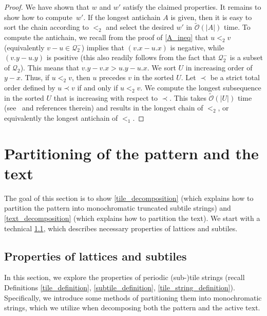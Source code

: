 \documentclass[11pt, letterpaper]{article}
\theoremstyle{plain}
\theoremstyle{definition}
\theoremstyle{remark}
\newcommand{\tO}{\tilde{\mathcal{O}}}
\newcommand{\Q}{\mathcal{Q}}
\newcommand{\absolute}[1]{\left\lvert#1\right\rvert}
\begin{document}
\begin{proof}
We have shown that $w$ and $w'$ satisfy the claimed properties. 
It remains to show how to compute~$w'$. 
If the longest antichain $A$ is given, then it is easy to sort the chain according to $<_2$ and select the desired $w'$ in $\tO(\absolute{A})$ time. To compute the antichain, we recall from the proof of \cref{A_ineq} that $u <_2 v$ (equivalently $v - u \in \Q_2^-$) implies that $(v.x - u.x)$ is negative, while $(v.y - u.y)$ is positive (this also readily follows from the fact that $\Q_2^-$ is a subset of $\Q_2$). This means that $v.y - v.x > u.y - u.x$. We sort $U$ in increasing order of $y - x$. Thus, if $u <_2 v$, then $u$ precedes $v$ in the sorted $U$. 
Let $\prec$ be a strict total order defined by $u \prec v$ if and only if $u <_2 v$. We compute the longest subsequence in the sorted $U$ that is increasing with respect to $\prec$. This takes $\tO(\absolute{U})$ time (see~\cite{CROCHEMORE20101054} and references therein) and results in the longest chain of $<_2$, or equivalently the longest antichain of $<_1$.
\end{proof}

\section{Partitioning of the pattern and the text}
The goal of this section is to show \cref{tile_decomposition} (which explains how to partition the pattern into monochromatic truncated subtile strings) and \cref{text_decomposition} (which explains how to partition the text). We start with a technical \cref{sec:lattices_subtiles}, which describes necessary properties of lattices and subtiles. 
 
\subsection{Properties of lattices and subtiles} \label{sec:lattices_subtiles}
In this section, we explore the properties of periodic (sub-)tile strings (recall Definitions \ref{tile_definition}, \ref{subtile_definition}, \ref{tile_string_definition}).
Specifically, we introduce some methods of partitioning them into monochromatic strings, which we utilize when decomposing both the pattern and the active text.
\end{document}
